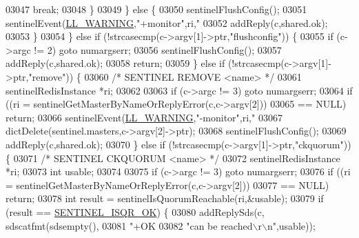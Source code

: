 \begin{DoxyCode}
{{{{{{{{{{{{{{{{{{{{{{{{{{{{{{{{{{{{{{{{{{{{{{{{{{{{{{{{{{03047                 \textcolor{keywordflow}{break};
03048             \}
03049         \} \textcolor{keywordflow}{else} \{
03050             sentinelFlushConfig();
03051             sentinelEvent(\hyperlink{server_8h_a31229b9334bba7d6be2a72970967a14b}{LL\_WARNING},\textcolor{stringliteral}{"+monitor"},ri,\textcolor{stringliteral}{"%
03052             addReply(c,shared.ok);
03053         \}
03054     \} \textcolor{keywordflow}{else} \textcolor{keywordflow}{if} (!strcasecmp(c->argv[1]->ptr,\textcolor{stringliteral}{"flushconfig"})) \{
03055         \textcolor{keywordflow}{if} (c->argc != 2) \textcolor{keywordflow}{goto} numargserr;
03056         sentinelFlushConfig();
03057         addReply(c,shared.ok);
03058         \textcolor{keywordflow}{return};
03059     \} \textcolor{keywordflow}{else} \textcolor{keywordflow}{if} (!strcasecmp(c->argv[1]->ptr,\textcolor{stringliteral}{"remove"})) \{
03060         \textcolor{comment}{/* SENTINEL REMOVE <name> */}
03061         sentinelRedisInstance *ri;
03062 
03063         \textcolor{keywordflow}{if} (c->argc != 3) \textcolor{keywordflow}{goto} numargserr;
03064         \textcolor{keywordflow}{if} ((ri = sentinelGetMasterByNameOrReplyError(c,c->argv[2]))
03065             == NULL) \textcolor{keywordflow}{return};
03066         sentinelEvent(\hyperlink{server_8h_a31229b9334bba7d6be2a72970967a14b}{LL\_WARNING},\textcolor{stringliteral}{"-monitor"},ri,\textcolor{stringliteral}{"%
03067         dictDelete(sentinel.masters,c->argv[2]->ptr);
03068         sentinelFlushConfig();
03069         addReply(c,shared.ok);
03070     \} \textcolor{keywordflow}{else} \textcolor{keywordflow}{if} (!strcasecmp(c->argv[1]->ptr,\textcolor{stringliteral}{"ckquorum"})) \{
03071         \textcolor{comment}{/* SENTINEL CKQUORUM <name> */}
03072         sentinelRedisInstance *ri;
03073         \textcolor{keywordtype}{int} usable;
03074 
03075         \textcolor{keywordflow}{if} (c->argc != 3) \textcolor{keywordflow}{goto} numargserr;
03076         \textcolor{keywordflow}{if} ((ri = sentinelGetMasterByNameOrReplyError(c,c->argv[2]))
03077             == NULL) \textcolor{keywordflow}{return};
03078         \textcolor{keywordtype}{int} result = sentinelIsQuorumReachable(ri,&usable);
03079         \textcolor{keywordflow}{if} (result == \hyperlink{sentinel_8c_a8d62015016e2a7110d1e75fcd4681e6a}{SENTINEL\_ISQR\_OK}) \{
03080             addReplySds(c, sdscatfmt(sdsempty(),
03081                 \textcolor{stringliteral}{"+OK %
03082                 \textcolor{stringliteral}{"can be reached\(\backslash\)r\(\backslash\)n"},usable));
}}}}}}}}}}}}}}}}}}}}}}}}}}}}}}}}}}}}}}}}}}}}}}}}}}}}}}}}}}}}}
\end{DoxyCode}
